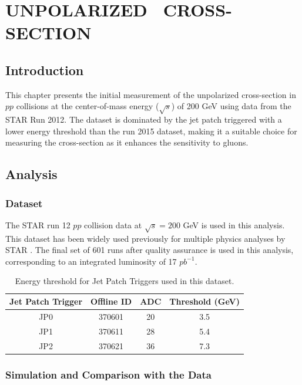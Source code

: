 
\chapter{UNPOLARIZED \pip\  CROSS-SECTION}
\label{chapter:xsec}
\section{Introduction}

This chapter presents the initial measurement of the unpolarized \dipion cross-section in $pp$ collisions at the center-of-mass energy ($\sqrt{s}$) of 200 GeV using data from the STAR Run 2012. The dataset is dominated by the jet patch triggered with a lower energy threshold than the run 2015 dataset, making it a suitable choice for measuring the cross-section as it enhances the sensitivity to gluons.
\section{Analysis}
\subsection{Dataset}
The STAR run 12 $pp$ collision data at $\sqrt{s} = 200$ GeV is used in this analysis. This dataset has been widely used previously for multiple physics analyses by STAR \cite{12data:spin2016, 12data:jpsi2018, 12data:gjet2020, 12data:jpsi2020, 12data:invjet2021}. The final set of 601 runs after quality assurance \cite{Adkins:2015ccl} is used in this analysis, corresponding to an integrated luminosity of 17 $pb^{-1}$.

\begin{table}[h]
    \centering
    \begin{tabular}{|c|c|c|c|}
        \hline
         Jet Patch Trigger& Offline ID & ADC & Threshold (GeV) \\
         \hline
         JP0 & 370601 & 20 & 3.5 \\ 
         JP1 & 370611 &28 & 5.4\\ 
         JP2 & 370621 &36 & 7.3\\ 
         \hline
    \end{tabular}
    \caption{Energy threshold for Jet Patch Triggers used in this dataset.}
    \label{tab:trigthreshold12}
\end{table}

\subsection{Simulation and  Comparison with the Data}

